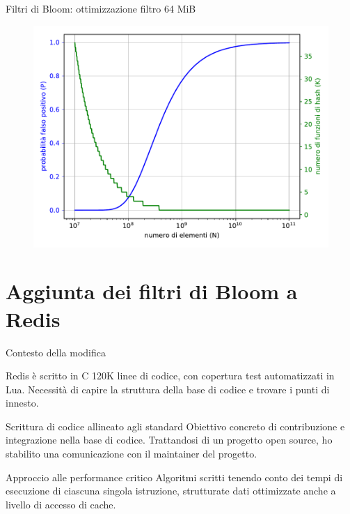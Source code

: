 \documentclass{beamer}
\begin{document}
	\begin{frame}[fragile]{Filtri di Bloom: ottimizzazione filtro 64 MiB}
			\begin{figure}
				\includegraphics[width=\textwidth]{img/bloom_parms_2}
			\end{figure}
	\end{frame}










	\section{Aggiunta dei filtri di Bloom a Redis}

	\begin{frame}{Contesto della modifica}
	  	\begin{block}{Redis è scritto in C}
	  	120K linee di codice, con copertura test automatizzati in Lua.
	  	Necessità di capire la struttura della base di codice e trovare
	  	i punti di innesto.
	  	\end{block}

	  	\begin{block}{Scrittura di codice allineato agli standard}
	  	Obiettivo concreto di contribuzione e integrazione nella base di codice. Trattandosi di un progetto open source, ho stabilito una comunicazione con il maintainer del progetto.
	  	\end{block}

	  	\begin{block}{Approccio alle performance critico}
	  	Algoritmi scritti tenendo conto dei tempi di esecuzione di
	  	ciascuna singola istruzione, strutturate dati ottimizzate
	  	anche a livello di accesso di cache.
	  	\end{block}
	\end{frame}
\end{document}
